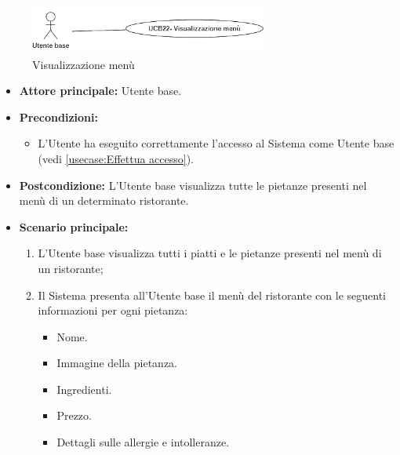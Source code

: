 \newpage
{}
\label{usecase:Visualizzazione menù}

\begin{figure}[h]
	\centering
	\includegraphics[width=0.7\textwidth]{./uml/UCB22.png} 
	\caption{Visualizzazione menù}
	\label{fig:UCB22}
  \end{figure}


\begin{itemize}
	\item \textbf{Attore principale:} Utente base.

	\item \textbf{Precondizioni:}
	      \begin{itemize}
		      \item L'Utente ha eseguito correttamente l'accesso al Sistema come
		            Utente base (vedi \autoref{usecase:Effettua accesso}).
	      \end{itemize}

	\item \textbf{Postcondizione:} L'Utente base visualizza tutte le pietanze presenti nel menù di un determinato ristorante.

	\item \textbf{Scenario principale:}
	      \begin{enumerate}
		      \item L'Utente base visualizza tutti i piatti e le pietanze presenti nel menù di un ristorante;
		      \item Il Sistema presenta all'Utente base il menù del ristorante con le seguenti informazioni per ogni pietanza:
		            \begin{itemize}
			            \item Nome.
			            \item Immagine della pietanza.
			            \item Ingredienti.
			            \item Prezzo.
			            \item Dettagli sulle allergie e intolleranze.
		            \end{itemize}
	      \end{enumerate}
\end{itemize}
